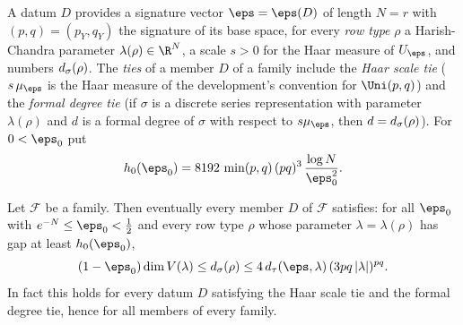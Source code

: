 \begin{definition}\label{pf:sh-curv:dsties}
A datum $D$ provides a signature vector $\eps=\eps(D)$ of length $N=r$ with $(p,q)=(p_Y,q_Y)$ the signature of its base
space, for every \emph{row type} $\rho$ a Harish-Chandra parameter $\lambda(\rho)\in\R^N$, a scale $s>0$ for the Haar
measure of $U_\eps$, and numbers $d_\sigma(\rho)$. The \emph{ties} of a member $D$ of a family include the
\emph{Haar scale tie} ($s\,\mu_\eps$ is the Haar measure of the development's convention for $\Uni(p,q)$) and the
\emph{formal degree tie} (if $\sigma$ is a discrete series representation with parameter $\lambda(\rho)$ and $d$ is a formal
degree of $\sigma$ with respect to $s\mu_\eps$, then $d=d_\sigma(\rho)$). For $0<\eps_0$ put
\[
\shcurvGap(\eps_0)=8192\,\min(p,q)\,(pq)^3\,\frac{\log N}{\eps_0^2}.
\]
\end{definition}

\begin{theorem}\label{pf:sh-curv:dsig}
Let $\mathcal F$ be a family. Then eventually every member $D$ of $\mathcal F$ satisfies: for all $\eps_0$ with
$e^{-N}\le\eps_0<\frac12$ and every row type $\rho$ whose parameter $\lambda=\lambda(\rho)$ has gap at least
$\shcurvGap(\eps_0)$,
\[
(1-\eps_0)\dim V(\lambda)\le\shcurvDs(\rho)\le4\,\shcurvDt(\eps,\lambda)\,(3pq\,|\lambda|)^{pq}.
\]
In fact this holds for every datum $D$ satisfying the Haar scale tie and the formal degree tie, hence for all members of
every family.
\end{theorem}

